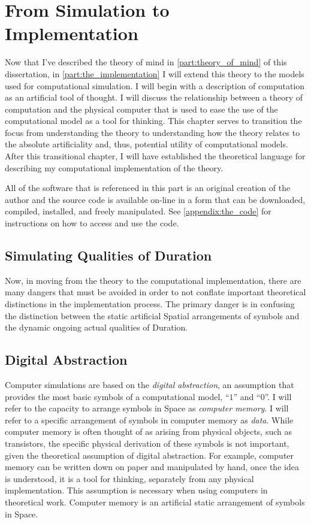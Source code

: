 \chapter{From Simulation to Implementation}
\label{chapter:from_simulation_to_implementation}

Now that I've described the theory of mind in
\autoref{part:theory_of_mind} of this dissertation, in
\autoref{part:the_implementation} I will extend this theory to the
models used for computational simulation.  I will begin with a
description of computation as an artificial tool of thought.  I will
discuss the relationship between a theory of computation and the
physical computer that is used to ease the use of the computational
model as a tool for thinking.  This chapter serves to transition the
focus from understanding the theory to understanding how the theory
relates to the absolute artificiality and, thus, potential utility of
computational models.  After this transitional chapter, I will have
established the theoretical language for describing my computational
implementation of the theory.

All of the software that is referenced in this part is an original
creation of the author and the source code is available on-line in a
form that can be downloaded, compiled, installed, and freely
manipulated.  See \autoref{appendix:the_code} for instructions on how
to access and use the code.

\section{Simulating Qualities of Duration}

Now, in moving from the theory to the computational implementation,
there are many dangers that must be avoided in order to not conflate
important theoretical distinctions in the implementation process.  The
primary danger is in confusing the distinction between the static
artificial Spatial arrangements of symbols and the dynamic ongoing
actual qualities of Duration.

\section{Digital Abstraction}

Computer simulations are based on the \emph{digital abstraction}, an
assumption that provides the most basic symbols of a computational
model, ``$1$'' and ``$0$''.  I will refer to the capacity to arrange
symbols in Space as \emph{computer memory}.  I will refer to a
specific arrangement of symbols in computer memory as \emph{data}.
While computer memory is often thought of as arising from physical
objects, such as transistors, the specific physical derivation of
these symbols is not important, given the theoretical assumption of
digital abstraction.  For example, computer memory can be written down
on paper and manipulated by hand, once the idea is understood, it is a
tool for thinking, separately from any physical implementation.  This
assumption is necessary when using computers in theoretical work.
Computer memory is an artificial static arrangement of symbols in
Space.

